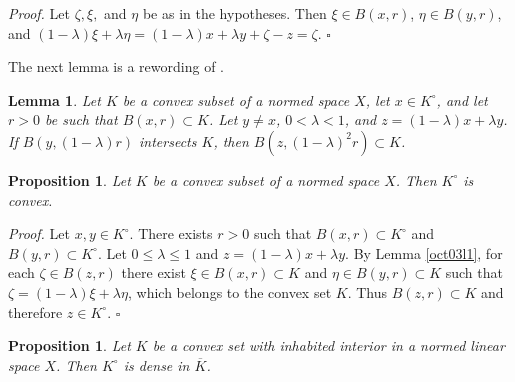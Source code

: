\documentclass[11pt]{article}%
\newtheorem{lemma}[theorem]{Lemma}
\newtheorem{proposition}[theorem]{Proposition}
\newenvironment{proof}[1][Proof]{\noindent\textit{#1.} }{}
\begin{document}
\begin{proof}
Let $\zeta,\xi,$ and $\eta$ be as in the hypotheses. Then $\xi\in B(x,r)$,
$\eta\in B(y,r)$, and $\left(  1-\lambda\right)  \xi+\lambda\eta=\left(
1-\lambda\right)  x+\lambda y+\zeta-z=\zeta$.%
\hfill
$\square$
\end{proof}

%

\medskip
The next lemma is a rewording of \cite[5.1.1]{BVtech}.

\begin{lemma}
\label{oct06l1}Let $K$ be a convex subset of a normed space $X$, let $x\in
K^{\circ}$, and let $r>0$ be such that $B(x,r)\subset K$. Let $y\neq x$,
$0<\lambda<1$, and $z=(1-\lambda)x+\lambda y$. If $B(y,(1-\lambda)r)$
intersects $K$, then $B(z,\left(  1-\lambda\right)  ^{2}r)\subset K$.
\end{lemma}

\begin{proposition}
\label{oct03p1}Let $K$ be a convex subset of a normed space $X$. Then
$K^{\circ}$ is convex.
\end{proposition}

\begin{proof}
Let $x,y\in K^{\circ}$. There exists $r>0$ such that $B(x,r)\subset K^{\circ}$
and $B(y,r)\subset K^{\circ}$. Let $0\leq\lambda\leq1$ and $z=(1-\lambda
)x+\lambda y$. By Lemma \ref{oct03l1}, for each $\zeta\in B(z,r)$ there exist
$\xi\in B(x,r)\subset K$ and $\eta\in B(y,r)\subset K$ such that
$\zeta=\left(  1-\lambda\right)  \xi+\lambda\eta$, which belongs to the convex
set $K$. Thus $B(z,r)\subset K$ and therefore $z\in K^{\circ}$.%
\hfill
$\square$
\end{proof}

\begin{proposition}
\label{oct06p1}Let $K$ be a convex set with inhabited interior in a normed
linear space $X$. Then $K^{\circ}$ is dense in $\overline{K}$.
\end{proposition}
\end{document}
